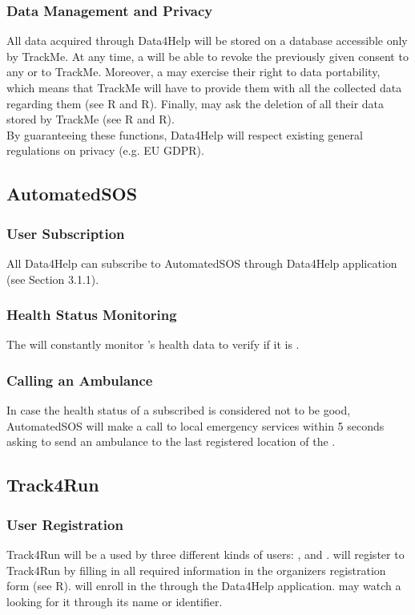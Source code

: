 \documentclass[../../rasd.tex]{subfiles}
\begin{document}
		\subsubsection{Data Management and Privacy}
		All data acquired through Data4Help will be stored on a database accessible only by TrackMe. At any time, a  will be able to revoke the previously given consent to any  or to TrackMe. Moreover, a  may exercise their right to data portability, which means that TrackMe will have to provide them with all the collected data regarding them (see R and R). Finally,  may ask the deletion of all their data stored by TrackMe (see R and R).\\
		By guaranteeing these functions, Data4Help will respect existing general regulations on privacy (e.g. EU GDPR).
	
	\subsection{AutomatedSOS}
		
		\subsubsection{User Subscription}
		All Data4Help  can subscribe to AutomatedSOS through Data4Help application (see Section 3.1.1).
		
		\subsubsection{Health Status Monitoring}
		The  will constantly monitor 's health data to verify if it is .
		
		\subsubsection{Calling an Ambulance}
		In case the health status of a subscribed  is considered not to be good, AutomatedSOS will make a call to local emergency services within 5 seconds asking to send an ambulance to the last registered location of the .

	\subsection{Track4Run}
		
		\subsubsection{User Registration}
		Track4Run will be a  used by three different kinds of users: ,  and .  will register to Track4Run by filling in all required information in the organizers registration form (see R).  will enroll in the  through the Data4Help application.  may watch a  looking for it through its name or identifier.
		
\end{document}
